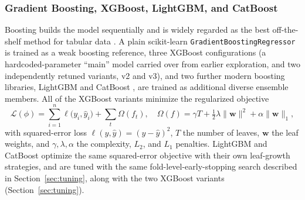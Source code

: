 \documentclass[journal]{IEEEtran}
\begin{document}
\subsubsection{Gradient Boosting, XGBoost, LightGBM, and CatBoost}
Boosting builds the model sequentially and is widely regarded as the best
off-the-shelf method for tabular data \cite{friedman2001,chen2016xgboost}. A
plain scikit-learn \texttt{GradientBoostingRegressor} is trained as a weak
boosting reference, three XGBoost configurations (a hardcoded-parameter
``main'' model carried over from earlier exploration, and two independently
retuned variants, v2 and v3), and two further modern boosting libraries,
LightGBM \cite{ke2017lightgbm} and CatBoost \cite{prokhorenkova2018catboost},
are trained as additional diverse ensemble members. All of the XGBoost variants
minimize the regularized objective
\begin{equation}
\mathcal{L}(\phi)=\sum_{i=1}^{n}\ell\!\big(y_i,\hat y_i\big)
+\sum_{t}\Omega(f_t),\quad
\Omega(f)=\gamma T+\tfrac{1}{2}\lambda\lVert\mathbf{w}\rVert^{2}
+\alpha\lVert\mathbf{w}\rVert_{1},
\label{eq:xgbobj}
\end{equation}
with squared-error loss $\ell(y,\hat y)=(y-\hat y)^2$, $T$ the number of leaves,
$\mathbf{w}$ the leaf weights, and $\gamma,\lambda,\alpha$ the complexity,
$L_2$, and $L_1$ penalties. LightGBM and CatBoost optimize the same
squared-error objective with their own leaf-growth strategies, and are tuned
with the same fold-level-early-stopping search described in
Section~\ref{sec:tuning}, along with the two XGBoost variants
(Section~\ref{sec:tuning}).
\end{document}

